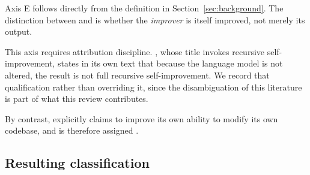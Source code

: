 Axis E follows directly from the definition in
Section~\ref{sec:background}. The distinction between  and
 is whether the \emph{improver} is itself improved, not merely
its output.

This axis requires attribution discipline. \cite{zelikman2023stop}, whose title
invokes recursive self-improvement, states in its own text that because the
language model is not altered, the result is not full recursive self-improvement.
We record that qualification rather than overriding it, since the
disambiguation of this literature is part of what this review contributes.

By contrast, \cite{zhang2025dgm} explicitly claims to improve its own ability
to modify its own codebase, and is therefore assigned .

\subsection{Resulting classification}

\begin{figure}[H]
\centering
\end{figure}

